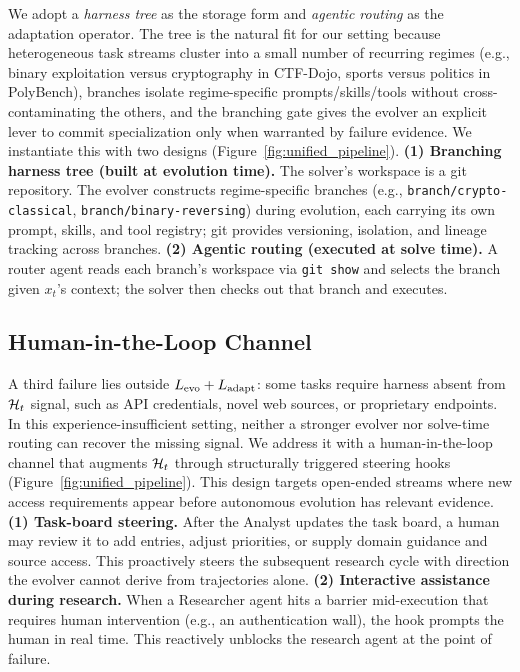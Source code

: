 We adopt a \emph{harness tree} as the storage form and \emph{agentic routing} as the adaptation operator. The tree is the natural fit for our setting because heterogeneous task streams cluster into a small number of recurring regimes (e.g., binary exploitation versus cryptography in CTF-Dojo, sports versus politics in PolyBench), branches isolate regime-specific prompts/skills/tools without cross-contaminating the others, and the branching gate gives the evolver an explicit lever to commit specialization only when warranted by failure evidence. We instantiate this with two designs (Figure~\ref{fig:unified_pipeline}). \textbf{(1) Branching harness tree (built at evolution time).} The solver's workspace is a git repository. The evolver constructs regime-specific branches (e.g., \texttt{branch/crypto-classical}, \texttt{branch/binary-reversing}) during evolution, each carrying its own prompt, skills, and tool registry; git provides versioning, isolation, and lineage tracking across branches. \textbf{(2) Agentic routing (executed at solve time).} A router agent reads each branch's workspace via \texttt{git show} and selects the branch given $x_t$'s context; the solver then checks out that branch and executes.

\subsection{Human-in-the-Loop Channel}
\label{sec:method-hitl}

A third failure lies outside $L_{\text{evo}} + L_{\text{adapt}}$: some tasks require harness absent from $\mathcal{H}_t$ signal, such as API credentials, novel web sources, or proprietary endpoints. In this experience-insufficient setting, neither a stronger evolver nor solve-time routing can recover the missing signal. We address it with a human-in-the-loop channel that augments $\mathcal{H}_t$ through structurally triggered steering hooks (Figure~\ref{fig:unified_pipeline}). This design targets open-ended streams where new access requirements appear before autonomous evolution has relevant evidence.
\noindent\textbf{(1) Task-board steering.}
After the Analyst updates the task board, a human may review it to add entries, adjust priorities, or supply domain guidance and source access. This proactively steers the subsequent research cycle with direction the evolver cannot derive from trajectories alone.
\noindent\textbf{(2) Interactive assistance during research.}
When a Researcher agent hits a barrier mid-execution that requires human intervention (e.g., an authentication wall), the hook prompts the human in real time. This reactively unblocks the research agent at the point of failure.
